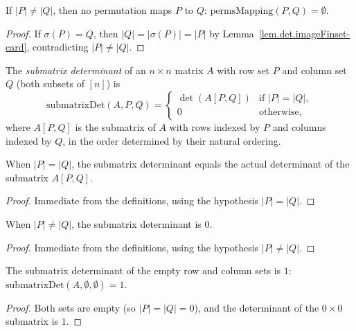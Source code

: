 \begin{lemma}
\label{lem.det.permsMapping-empty}
\leanhelper
\leanok
If $|P| \neq |Q|$, then no permutation maps $P$ to $Q$:
$\mathrm{permsMapping}(P, Q) = \emptyset$.
\end{lemma}

\begin{proof}
\leanok
If $\sigma(P) = Q$, then $|Q| = |\sigma(P)| = |P|$
by Lemma~\ref{lem.det.imageFinset-card}, contradicting $|P| \neq |Q|$.
\end{proof}

\begin{definition}
\label{def.det.submatrixDet}
\leanhelper
\leanok
The \emph{submatrix determinant} of an $n \times n$ matrix $A$ with row set $P$
and column set $Q$ (both subsets of $[n]$) is
\[
\mathrm{submatrixDet}(A, P, Q) =
\begin{cases}
\det(A[P, Q]) & \text{if } |P| = |Q|, \\
0 & \text{otherwise,}
\end{cases}
\]
where $A[P, Q]$ is the submatrix of $A$ with rows indexed by $P$ and columns
indexed by $Q$, in the order determined by their natural ordering.
\end{definition}

\begin{lemma}
\label{lem.det.submatrixDet-card-eq}
\leanhelper
\leanok
When $|P| = |Q|$, the submatrix determinant equals the actual determinant
of the submatrix $A[P, Q]$.
\end{lemma}

\begin{proof}
\leanok
Immediate from the definitions, using the hypothesis $|P| = |Q|$.
\end{proof}

\begin{lemma}
\label{lem.det.submatrixDet-card-ne}
\leanhelper
\leanok
When $|P| \neq |Q|$, the submatrix determinant is $0$.
\end{lemma}

\begin{proof}
\leanok
Immediate from the definitions, using the hypothesis $|P| \neq |Q|$.
\end{proof}

\begin{lemma}
\label{lem.det.submatrixDet-empty}
\leanhelper
\leanok
The submatrix determinant of the empty row and column sets is $1$:
$\mathrm{submatrixDet}(A, \emptyset, \emptyset) = 1$.
\end{lemma}

\begin{proof}
\leanok
Both sets are empty (so $|P| = |Q| = 0$), and the determinant of the
$0 \times 0$ submatrix is $1$.
\end{proof}
